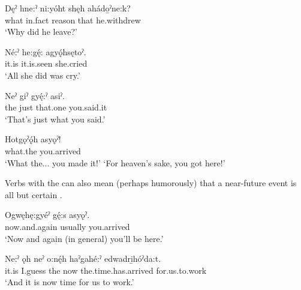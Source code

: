 \ex
\gll Dęˀ hne:ˀ ni:yóht shęh ahádo̱ˀne:k? \\
what in.fact reason that he.withdrew  \\
\glt ‘Why did he leave?’


\ex
\gll Né:ˀ he:gę́: agyǫ́hsętoˀ. \\
it.is it.is.seen she.cried \\
\glt ‘All she did was cry.’


\ex
\gll Neˀ giˀ gyę́:ˀ asiˀ.\\
the just that.one you.said.it \\
\glt ‘That’s just what you said.’ 


\ex
\gll Hotgǫˀǫ́h asyǫˀ! \\
what.the you.arrived \\
\glt ‘What the... you made it!’ ‘For heaven’s sake, you got here!’
\z
\z

Verbs with the  {\factual} can also mean (perhaps humorously) that a near-future event is all but certain .

\ea\label{ex:moodex16} 
\ea
\gll Ogwęhę:gyéˀ gę́:s asyǫˀ. \\
now.and.again usually you.arrived \\
\glt ‘Now and again (in general) you’ll be here.’ 

\ex
\gll Ne:ˀ ǫh neˀ o:nę́h haˀgahé:ˀ edwadri̱hóˀda:t. \\
it.is I.guess the now the.time.has.arrived for.us.to.work \\
\glt ‘And it is now time for us to work.’
\z
\z


